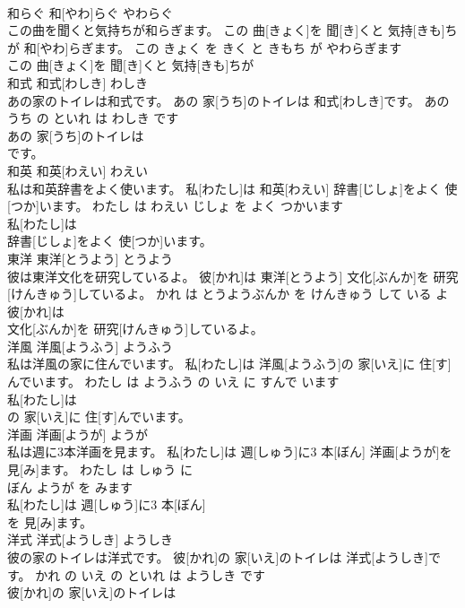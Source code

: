 \documentclass[8pt]{extreport}
\begin{document}
\begin{CJK}{UTF8}{min}
\\	和らぐ	和[やわ]らぐ	やわらぐ	
\\	この曲を聞くと気持ちが和らぎます。	この 曲[きょく]を 聞[き]くと 気持[きも]ちが 和[やわ]らぎます。	この きょく を きく と きもち が やわらぎます	
\\	この 曲[きょく]を 聞[き]くと 気持[きも]ちが
\\	和式	和式[わしき]	わしき	
\\	あの家のトイレは和式です。	あの 家[うち]のトイレは 和式[わしき]です。	あの うち の といれ は わしき です	
\\	あの 家[うち]のトイレは
\\	です。			
\\	和英	和英[わえい]	わえい	
\\	私は和英辞書をよく使います。	私[わたし]は 和英[わえい] 辞書[じしょ]をよく 使[つか]います。	わたし は わえい じしょ を よく つかいます	
\\	私[わたし]は
\\	辞書[じしょ]をよく 使[つか]います。			
\\	東洋	東洋[とうよう]	とうよう	
\\	彼は東洋文化を研究しているよ。	彼[かれ]は 東洋[とうよう] 文化[ぶんか]を 研究[けんきゅう]しているよ。	かれ は とうようぶんか を けんきゅう して いる よ	
\\	彼[かれ]は
\\	文化[ぶんか]を 研究[けんきゅう]しているよ。			
\\	洋風	洋風[ようふう]	ようふう	
\\	私は洋風の家に住んでいます。	私[わたし]は 洋風[ようふう]の 家[いえ]に 住[す]んでいます。	わたし は ようふう の いえ に すんで います	
\\	私[わたし]は
\\	の 家[いえ]に 住[す]んでいます。			
\\	洋画	洋画[ようが]	ようが	
\\	私は週に3本洋画を見ます。	私[わたし]は 週[しゅう]に3 本[ぼん] 洋画[ようが]を 見[み]ます。	わたし は しゅう に 
\\	ぼん ようが を みます	
\\	私[わたし]は 週[しゅう]に3 本[ぼん]
\\	を 見[み]ます。			
\\	洋式	洋式[ようしき]	ようしき	
\\	彼の家のトイレは洋式です。	彼[かれ]の 家[いえ]のトイレは 洋式[ようしき]です。	かれ の いえ の といれ は ようしき です	
\\	彼[かれ]の 家[いえ]のトイレは

\end{CJK}
\end{document}
